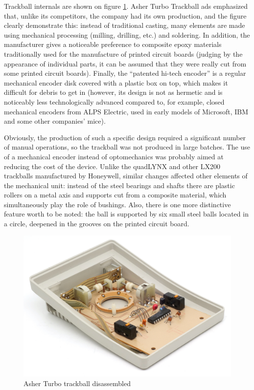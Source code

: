 \documentclass[11pt, a4paper]{article}
\begin{document}
Trackball internals are shown on figure \ref{fig:AsherInside}. Asher Turbo Trackball ads emphasized that, unlike its competitors, the company had its own production, and the figure clearly demonstrate this: instead of traditional casting, many elements are made using mechanical processing (milling, drilling, etc.) and soldering. In addition, the manufacturer gives a noticeable preference to composite epoxy materials traditionally used for the manufacture of printed circuit boards (judging by the appearance of individual parts, it can be assumed that they were really cut from some printed circuit boards). Finally, the ``patented hi-tech encoder'' is a regular mechanical encoder disk covered with a plastic box on top, which makes it difficult for debris to get in (however, its design is not as hermetic and is noticeably less technologically advanced compared to, for example, closed mechanical encoders from ALPS Electric, used in early models of Microsoft, IBM and some other companies' mice).

Obviously, the production of such a specific design required a significant number of manual operations, so the trackball was not produced in large batches.
The use of a mechanical encoder instead of optomechanics was probably aimed at reducing the cost of the device. Unlike the quadLYNX and other LX200 trackballs manufactured by Honeywell, similar changes affected other elements of the mechanical unit: instead of the steel bearings and shafts there are plastic rollers on a metal axis and supports cut from a composite material, which simultaneously play the role of bushings. Also, there is one more distinctive feature worth to be noted: the ball is supported by six small steel balls located in a circle, deepened in the grooves on the printed circuit board.

\begin{figure}[h]
    \centering
    \includegraphics[scale=0.7]{1988_asher_turbo_trackball/inside_60.jpg}
    \caption{Asher Turbo trackball disassembled}
    \label{fig:AsherInside}
\end{figure}
\end{document}
